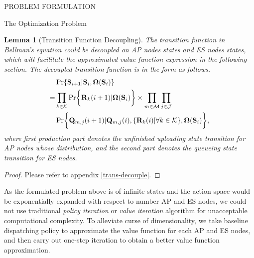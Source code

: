 \documentclass[10pt, conference, letterpaper]{IEEEtran}
\newtheorem{lemma}{Lemma}
\renewcommand{\vec}{\mathbf}
\DeclarePairedDelimiter{\set}{\{}{\}}
\DeclarePairedDelimiter{\Brace}{\bigg\{}{\bigg\}}
\newcommand{\apSet}{\mathcal{K}}
\newcommand{\esSet}{\mathcal{M}}
\newcommand{\jSpace}{\mathcal{J}}
\newcommand{\Stat}{\mathbf{S}}
\newcommand{\Policy}{\mathbf{\Omega}}
\begin{document}
\begin{section}{PROBLEM FORMULATION}
\begin{subsection}{The Optimization Problem}
            \begin{lemma}[Transition Function Decoupling]
                The transition function in Bellman's equation could be decoupled on AP nodes states and ES nodes states, which will facilitate the approximated value function expression in the following section. The decoupled transition function is in the form as follows.
                \begin{align}
                    & \Pr\{\Stat_{i+1}|\Stat_{i}, \Policy(\Stat_{i})\} 
                    \nonumber\\
                    =& \prod_{k\in\apSet} \Pr\Brace{\vec{R}_k(i+1)|\Policy(\Stat_{i})} \times \prod_{m\in\esSet}\prod_{j\in\jSpace}
                        \nonumber\\
                        & \Pr \Brace{\vec{Q}_{m,j}(i+1)|\vec{Q}_{m,j}(i), \set{\vec{R}_k(i)|\forall k\in\apSet}, \Policy(\Stat_{i})},
                \end{align}
                where first production part denotes the unfinished uploading state transition for AP nodes whose distribution, and the second part denotes the queueing state transition for ES nodes.
            \end{lemma}
            \begin{proof}
                Please refer to appendix \ref{trans-decouple}.
            \end{proof}

            As the formulated problem above is of infinite states and the action space would be exponentially expanded with respect to number AP and ES nodes, we could not use traditional \emph{policy iteration} or \emph{value iteration} algorithm \cite{sutton1998introduction} for unacceptable computational complexity. To alleviate curse of dimensionality, we take baseline dispatching policy to approximate the value function for each AP and ES nodes, and then carry out one-step iteration to obtain a better value function approximation.
        \end{subsection}
    \end{section}
\end{document}
